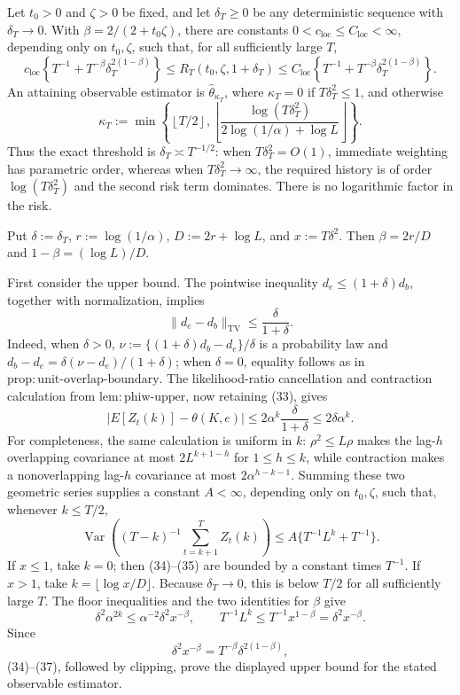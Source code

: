 Let \(t_0>0\) and \(\zeta>0\) be fixed, and let \(\delta_T\ge0\) be any deterministic sequence with \(\delta_T\to0\).  With \(\beta=2/(2+t_0\zeta)\), there are constants \(0<c_{\mathrm{loc}}\le C_{\mathrm{loc}}<\infty\), depending only on \(t_0,\zeta\), such that, for all sufficiently large \(T\),
\[
 c_{\mathrm{loc}}\left\{T^{-1}+T^{-\beta}\delta_T^{2(1-\beta)}\right\}
 \le R_T(t_0,\zeta,1+\delta_T)
 \le C_{\mathrm{loc}}\left\{T^{-1}+T^{-\beta}\delta_T^{2(1-\beta)}\right\}.
\]
An attaining observable estimator is \(\widehat\theta_{\kappa_T}\), where \(\kappa_T=0\) if \(T\delta_T^2\le1\), and otherwise
\[
 \kappa_T:=\min\!\left\{\left\lfloor T/2\right\rfloor,
 \left\lfloor\frac{\log(T\delta_T^2)}{2\log(1/\alpha)+\log L}\right\rfloor\right\}.
\]
Thus the exact threshold is \(\delta_T\asymp T^{-1/2}\): when \(T\delta_T^2=O(1)\), immediate weighting has parametric order, whereas when \(T\delta_T^2\to\infty\), the required history is of order \(\log(T\delta_T^2)\) and the second risk term dominates.  There is no logarithmic factor in the risk.

Put \(\delta:=\delta_T\), \(r:=\log(1/\alpha)\), \(D:=2r+\log L\), and \(x:=T\delta^2\).  Then \(\beta=2r/D\) and \(1-\beta=(\log L)/D\).

First consider the upper bound.  The pointwise inequality \(d_e\le(1+\delta)d_b\), together with normalization, implies
\[
 \|d_e-d_b\|_{\mathrm{TV}}\le\frac{\delta}{1+\delta}. \tag{33}
\]
Indeed, when \(\delta>0\),
\(\nu:=\{(1+\delta)d_b-d_e\}/\delta\) is a probability law and
\(d_b-d_e=\delta(\nu-d_e)/(1+\delta)\); when \(\delta=0\), equality follows as in \(\mathrm{prop{:}unit\text{-}overlap\text{-}boundary}\).  The likelihood-ratio cancellation and contraction calculation from \(\mathrm{lem{:}phiw\text{-}upper}\), now retaining (33), gives
\[
 |E[Z_t(k)]-\theta(K,e)|
 \le2\alpha^k\frac{\delta}{1+\delta}\le2\delta\alpha^k. \tag{34}
\]
For completeness, the same calculation is uniform in \(k\): \(\rho^2\le L\rho\) makes the lag-\(h\) overlapping covariance at most \(2L^{k+1-h}\) for \(1\le h\le k\), while contraction makes a nonoverlapping lag-\(h\) covariance at most \(2\alpha^{h-k-1}\).  Summing these two geometric series supplies a constant \(A<\infty\), depending only on \(t_0,\zeta\), such that, whenever \(k\le T/2\),
\[
 \operatorname{Var}\!\left((T-k)^{-1}\sum_{t=k+1}^TZ_t(k)\right)
 \le A\{T^{-1}L^k+T^{-1}\}. \tag{35}
\]
If \(x\le1\), take \(k=0\); then (34)--(35) are bounded by a constant times \(T^{-1}\).  If \(x>1\), take \(k=\lfloor\log x/D\rfloor\).  Because \(\delta_T\to0\), this is below \(T/2\) for all sufficiently large \(T\).  The floor inequalities and the two identities for \(\beta\) give
\[
 \delta^2\alpha^{2k}\le\alpha^{-2}\delta^2x^{-\beta},
 \qquad
 T^{-1}L^k\le T^{-1}x^{1-\beta}=\delta^2x^{-\beta}. \tag{36}
\]
Since
\[
 \delta^2x^{-\beta}=T^{-\beta}\delta^{2(1-\beta)}, \tag{37}
\]
(34)--(37), followed by clipping, prove the displayed upper bound for the stated observable estimator.

